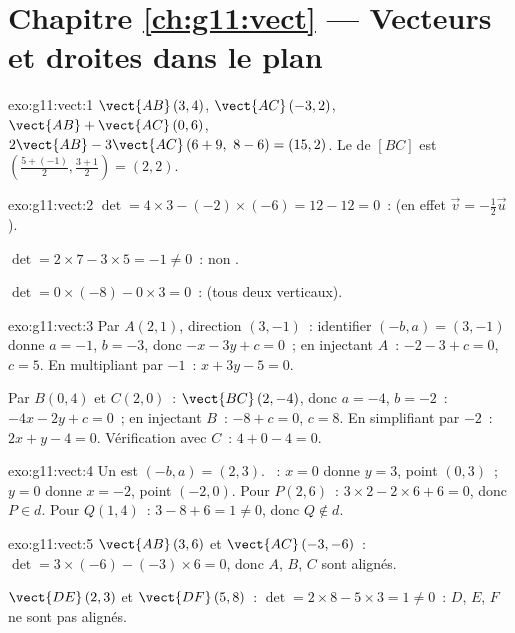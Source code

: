 \section*{Chapitre \ref{ch:g11:vect} --- Vecteurs et droites dans le plan}

\begin{solution}{exo:g11:vect:1}
$\vect{AB}\,(3, 4)$, $\vect{AC}\,(-3, 2)$,
$\vect{AB} + \vect{AC}\,(0, 6)$,
$2\vect{AB} - 3\vect{AC}\,(6 + 9,\ 8 - 6) = (15, 2)$. Le  de
$[BC]$ est $\left(\frac{5 + (-1)}{2}, \frac{3+1}{2}\right) = (2, 2)$.
\end{solution}

\begin{solution}{exo:g11:vect:2}
$\det = 4 \times 3 - (-2) \times (-6) = 12 - 12 = 0$~:  (en
effet $\vec v = -\frac12 \vec u$).

$\det = 2 \times 7 - 3 \times 5 = -1 \neq 0$~: non .

$\det = 0 \times (-8) - 0 \times 3 = 0$~:  (tous deux
verticaux).
\end{solution}

\begin{solution}{exo:g11:vect:3}
Par $A(2,1)$, direction $(3, -1)$~: identifier $(-b, a) = (3, -1)$ donne
$a = -1$, $b = -3$, donc $-x - 3y + c = 0$~; en injectant $A$~:
$-2 - 3 + c = 0$, $c = 5$. En multipliant par $-1$~: $x + 3y - 5 = 0$.

Par $B(0,4)$ et $C(2,0)$~: $\vect{BC}\,(2, -4)$, donc $a = -4$,
$b = -2$~: $-4x - 2y + c = 0$~; en injectant $B$~: $-8 + c = 0$,
$c = 8$. En simplifiant par $-2$~: $2x + y - 4 = 0$. Vérification avec
$C$~: $4 + 0 - 4 = 0$.
\end{solution}

\begin{solution}{exo:g11:vect:4}
Un  est $(-b, a) = (2, 3)$. ~: $x = 0$
donne $y = 3$, point $(0, 3)$~; $y = 0$ donne $x = -2$, point $(-2, 0)$.
Pour $P(2,6)$~: $3 \times 2 - 2 \times 6 + 6 = 0$, donc $P \in d$. Pour
$Q(1,4)$~: $3 - 8 + 6 = 1 \neq 0$, donc $Q \notin d$.
\end{solution}

\begin{solution}{exo:g11:vect:5}
$\vect{AB}\,(3, 6)$ et $\vect{AC}\,(-3, -6)$~:
$\det = 3 \times (-6) - (-3) \times 6 = 0$, donc $A$, $B$, $C$ sont
alignés.

$\vect{DE}\,(2, 3)$ et $\vect{DF}\,(5, 8)$~:
$\det = 2 \times 8 - 5 \times 3 = 1 \neq 0$~: $D$, $E$, $F$ ne sont pas
alignés.
\end{solution}

